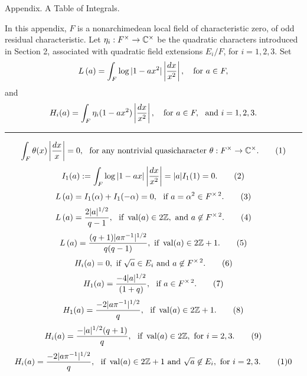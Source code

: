 \vfill\break
\centerline{\headfont Appendix. A Table of Integrals.}
\bigskip      


In this appendix, $F$ is a nonarchimedean 
local field of characteristic zero,
of odd residual characteristic.  Let $\eta_i:F^\times\to {\Bbb C}^\times$
be the quadratic characters introduced in Section 2, associated with
quadratic field extensions $E_i/F$, for $i=1,2,3$.
Set
$${L\,}(a) = \int_F \log|1-a x^2| \left | {dx\over x^2}\right |,\ \ \hbox{ for } a\in F,$$
and
$$H_i(a) = \int_F \eta_i(1-a x^2) \leftdx,\ \ \hbox{ for } a\in F,
\hbox{ \ and } i=1,2,3.$$

\bigskip
\hrule
\bigskip

$$\int_F\theta(x)\left|{dx\over x}\right| = 0, \ 
\hbox{\  for any nontrivial quasicharacter\  }
 \theta: F^\times\to \C^\times. 
\tag1$$
$$I_1(a):= \int_F \log|1-a x| \leftdx = |a|I_1(1) = 0.\tag2$$
$$\LOG(a) = I_1(\alpha) + I_1(-\alpha) =0,\ \hbox{ if } a=\alpha^2\in F^{\times\,2}.\tag3$$
$$\LOG(a) = {2|a|^{1/2}\over q-1}, \ \hbox{ if } \val(a) \in 2{\Bbb Z},
		\hbox{ and } a\not\in F^{\times\,2}.\tag4$$
%
$$\LOG(a) = {(q+1)|a\pi^{-1}|^{1/2}\over q(q-1)}, \hbox{ if }
		\val(a) \in 2{\Bbb Z}+1.\tag5$$
%
$$H_i(a) = 0, \hbox{ if } \sqrt{a} \in E_i \hbox{ and } a\not\in 
		F^{\times\,2}.\tag6$$
%
$$H_1(a) = {-4|a|^{1/2}\over (1+q)}, \ \hbox{ if } a\in F^{\times\,2}.\tag7$$
%
%
$$H_1(a) = {-2|a\pi^{-1}|^{1/2}\over q},\ \hbox{ if }
		\val(a)\in 2{\Bbb Z} + 1.\tag8$$
%
$$H_i(a) = {-|a|^{1/2}(q+1)\over q},\ \hbox{ if }
		\val(a)\in 2{\Bbb Z}, \hbox{ for } i=2,3.\tag9$$
%
$$H_i(a) = {-2|a\pi^{-1}|^{1/2}\over q},\ \hbox{ if }
		\val(a)\in 2{\Bbb Z}+1 \hbox{ and }
		\sqrt{a}\not\in E_i, \hbox{ for } i=2,3.\tag10$$


